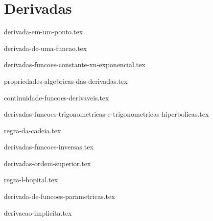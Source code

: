 \part{Derivadas}

{derivada-em-um-ponto.tex}

{derivada-de-uma-funcao.tex}

{derivadas-funcoes-constante-xn-exponencial.tex}

{propriedades-algebricas-das-derivadas.tex}

{continuidade-funcoes-derivaveis.tex}

{derivadas-funcoes-trigonometricas-e-trigonometricas-hiperbolicas.tex}

{regra-da-cadeia.tex}

{derivadas-funcoes-inversas.tex}

{derivadas-ordem-superior.tex}

{regra-l-hopital.tex}

{derivada-de-funcoes-parametricas.tex}

{derivacao-implicita.tex}

